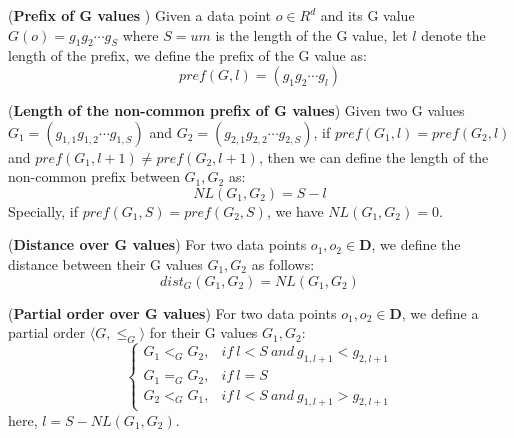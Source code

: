 \documentclass[twocolumn]{svjour3}          %
\begin{document}

\begin{definition}
\label{def:zprefix}
(\textbf{Prefix of G values }) Given a data point $o\in R^d$ and its G value $G(o)=g_1g_2\cdots g_S$ where $S=um$ is the length of the G value, let $l$ denote the length of the prefix, we define the prefix of the G value as:
\begin{equation}
\label{eq:zprefix}
pref(G,l)=(g_1g_2\cdots g_l)
\end{equation}
\end{definition}

\begin{definition}
\label{def:gncpl}
(\textbf{Length of the non-common prefix of G values}) Given two G values $G_1=(g_{1,1}g_{1,2}\cdots g_{1,S})$ and $G_2=(g_{2,1}g_{2,2}\cdots g_{2,S})$, if $pref(G_1,l)=pref(G_2,l)$ and $pref(G_1,l+1)\neq pref(G_2, l+1)$, then we can define the length of the non-common prefix between $G_1, G_2$ as:
\begin{equation}
\label{eq:gncpl}
NL(G_1,G_2)=S-l
\end{equation}
Specially, if $pref(G_1,S)=pref(G_2,S)$, we have $NL(G_1,G_2)=0$.
\end{definition}

\begin{definition}
\label{def:gdis}
(\textbf{Distance over G values}) For two data points $o_1, o_2 \in \textbf{D}$, we define the distance between their G values $G_1,G_2$ as follows:
\begin{equation}
\label{eq:gdis}
dist_G(G_1,G_2)=NL(G_1,G_2)
\end{equation}
\end{definition}

\begin{definition}
\label{def:gpartial}
(\textbf{Partial order over G values}) For two data points $o_1, o_2 \in \textbf{D}$, we define a partial order $\langle G, \leq_G \rangle$ for their G values $G_1,G_2$:
\begin{equation}\label{eq:gpartialorder}
\left\{ {\begin{array}{ll}
{G_1<_G G_2,} & {if\ l<S\ and\ g_{1,l+1}<g_{2,l+1}} \\
{G_1=_G G_2,} & {if\ l=S}\\
{G_2<_G G_1,} & {if\ l<S\ and\ g_{1,l+1}>g_{2,l+1}}
\end{array}} \right.
\end{equation}
here, $l=S-NL(G_1,G_2)$.
\end{definition}
\end{document}
